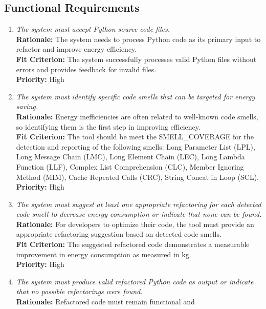\documentclass[12pt]{article}
\begin{document}
\subsection{Functional Requirements}
\begin{enumerate}[label=FR \arabic*., wide=0pt, leftmargin=*]
  \item \emph{The system must accept Python source code files.}\\[2mm]
    {\bf Rationale:} The system needs to process Python code as its
    primary input to refactor and improve energy efficiency.\\
    {\bf Fit Criterion:} The system successfully processes valid
    Python files without errors and provides feedback for invalid files.\\
    {\bf Priority:} High
  \item \emph{The system must identify specific code smells that can
    be targeted for energy saving.}\\[2mm]
    {\bf Rationale:} Energy inefficiencies are often related to
    well-known code smells, so identifying them is the first step in
    improving efficiency.\\
    {\bf Fit Criterion:} The tool should be meet the SMELL\_COVERAGE
    for the detection and reporting of the following smells: Long
    Parameter List (LPL), Long Message Chain (LMC), Long Element
    Chain (LEC), Long Lambda Function (LLF), Complex List
    Comprehension (CLC), Member Ignoring Method (MIM), Cache Repeated
    Calls (CRC),
    String Concat in Loop (SCL).\\
    {\bf Priority:} High
  \item \emph{The system must suggest at least one appropriate
      refactoring for each detected code smell to decrease energy
    consumption or indicate that none can be found.}\\[2mm]
    {\bf Rationale:} For developers to optimize their code, the tool
    must provide an appropriate refactoring suggestion based on
    detected code smells.\\
    {\bf Fit Criterion:} The suggested refactored code demonstrates a
    measurable improvement in energy consumption as measured in kg.\\
    {\bf Priority:} High
  \item \emph{The system must produce valid refactored Python code as
    output or indicate that no possible refactorings were found.}\\[2mm]
    {\bf Rationale:} Refactored code must remain functional and

\end{enumerate}
\end{document}
